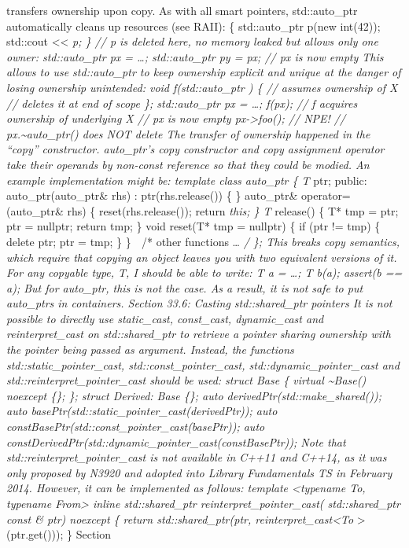 transfers ownership upon copy. As with all smart pointers,
std::auto\_ptr automatically cleans up resources (see RAII): \{
std::auto\_ptr p(new int(42)); std::cout \textless\textless{} \emph{p;
\} // p is deleted here, no memory leaked but allows only one owner:
std::auto\_ptr px = \ldots; std::auto\_ptr py = px; // px is now empty
This allows to use std::auto\_ptr to keep ownership explicit and unique
at the danger of losing ownership unintended: void f(std::auto\_ptr ) \{
// assumes ownership of X // deletes it at end of scope \};
std::auto\_ptr px = \ldots; f(px); // f acquires ownership of underlying
X // px is now empty px-\textgreater foo(); // NPE! //
px.\textasciitilde auto\_ptr() does NOT delete The transfer of ownership
happened in the ``copy'' constructor. auto\_ptr's copy constructor and
copy assignment operator take their operands by non-const reference so
that they could be modied. An example implementation might be: template
class auto\_ptr \{ T} ptr; public: auto\_ptr(auto\_ptr\& rhs) :
ptr(rhs.release()) \{ \} auto\_ptr\& operator=(auto\_ptr\& rhs) \{
reset(rhs.release()); return \emph{this; \} T} release() \{ T* tmp =
ptr; ptr = nullptr; return tmp; \} void reset(T* tmp = nullptr) \{ if
(ptr != tmp) \{ delete ptr; ptr = tmp; \} \}  /* other functions
\ldots{} \emph{/ \}; This breaks copy semantics, which require that
copying an object leaves you with two equivalent versions of it. For any
copyable type, T, I should be able to write: T a = \ldots; T b(a);
assert(b == a); But for auto\_ptr, this is not the case. As a result, it
is not safe to put auto\_ptrs in containers. Section 33.6: Casting
std::shared\_ptr pointers It is not possible to directly use
static\_cast, const\_cast, dynamic\_cast and reinterpret\_cast on
std::shared\_ptr to retrieve a pointer sharing ownership with the
pointer being passed as argument. Instead, the functions
std::static\_pointer\_cast, std::const\_pointer\_cast,
std::dynamic\_pointer\_cast and std::reinterpret\_pointer\_cast should
be used: struct Base \{ virtual \textasciitilde Base() noexcept \{\};
\}; struct Derived: Base \{\}; auto derivedPtr(std::make\_shared());
auto basePtr(std::static\_pointer\_cast(derivedPtr)); auto
constBasePtr(std::const\_pointer\_cast(basePtr)); auto
constDerivedPtr(std::dynamic\_pointer\_cast(constBasePtr)); Note that
std::reinterpret\_pointer\_cast is not available in C++11 and C++14, as
it was only proposed by N3920 and adopted into Library Fundamentals TS
in February 2014. However, it can be implemented as follows: template
\textless typename To, typename From\textgreater{} inline
std::shared\_ptr reinterpret\_pointer\_cast( std::shared\_ptr const \&
ptr) noexcept \{ return std::shared\_ptr(ptr,
reinterpret\_cast\textless To }\textgreater(ptr.get())); \} Section
